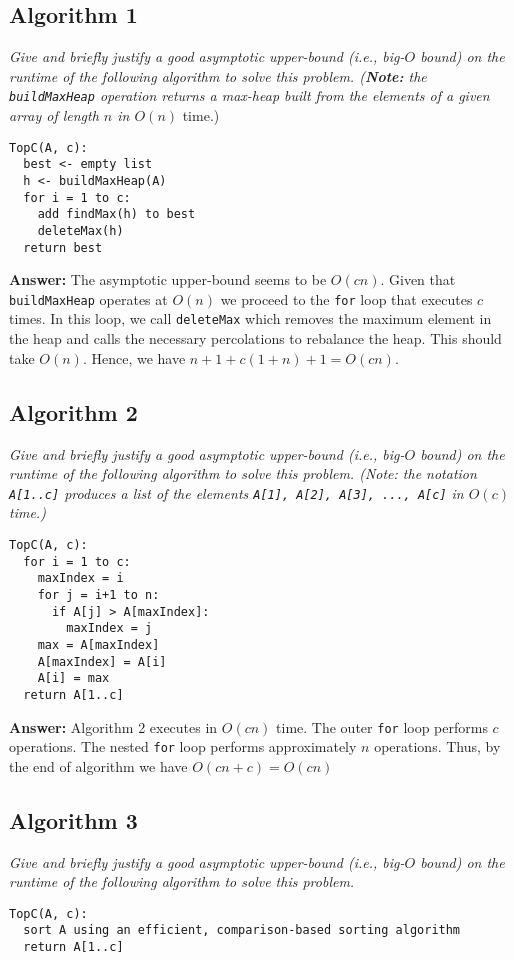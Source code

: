 \documentclass[11pt, oneside]{article}   	%
\theoremstyle{definition}
\theoremstyle{remark}
\begin{document}
\subsection{Algorithm 1}
\textit{Give and briefly justify a good asymptotic upper-bound (i.e., big-$O$
bound) on the runtime of the following algorithm to solve this problem. (\textbf{Note:} the \texttt{buildMaxHeap} operation returns a max-heap built from the elements of a given array of length $n$ in $O(n)$}
time.)
\begin{verbatim}
TopC(A, c):
  best <- empty list
  h <- buildMaxHeap(A)
  for i = 1 to c:
    add findMax(h) to best
    deleteMax(h)
  return best
\end{verbatim}

\textbf{Answer: } The asymptotic upper-bound seems to be $O(cn)$. Given that \texttt{buildMaxHeap} operates at $O(n)$ we proceed to the \texttt{for} loop that executes $c$ times. In this loop, we call \texttt{deleteMax} which removes the maximum element in the heap and calls the necessary percolations to rebalance the heap. This should take $O(n)$. Hence, we have $n+1+c(1+n)+1 = O(cn)$.

\subsection{Algorithm 2}
\textit{Give and briefly justify a good asymptotic upper-bound (i.e., big-$O$
bound) on the runtime of the following algorithm to solve this problem. (Note: the notation \texttt{A[1..c]} produces a list of the elements \texttt{A[1], A[2], A[3], ..., A[c]} in $O(c)$ time.)}
\begin{verbatim}
TopC(A, c):
  for i = 1 to c:
    maxIndex = i
    for j = i+1 to n:
      if A[j] > A[maxIndex]:
        maxIndex = j
    max = A[maxIndex]
    A[maxIndex] = A[i]
    A[i] = max
  return A[1..c]
\end{verbatim}

\textbf{Answer: } Algorithm 2 executes in $O(cn)$ time. The outer \texttt{for} loop  performs $c$ operations. The nested \texttt{for} loop performs  approximately $n$ operations. Thus, by the end of algorithm we have $O(cn + c) = O(cn)$


\subsection{Algorithm 3}
\textit{Give and briefly justify a good asymptotic upper-bound (i.e., big-$O$
bound) on the runtime of the following algorithm to solve this problem.}
\begin{verbatim}
TopC(A, c):
  sort A using an efficient, comparison-based sorting algorithm
  return A[1..c]
\end{verbatim}
\end{document}
